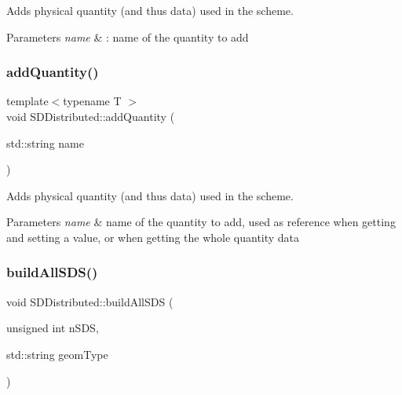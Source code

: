 Adds physical quantity (and thus data) used in the scheme. 


\begin{DoxyParams}{Parameters}
{\em name} & \+: name of the quantity to add \\
\hline
\end{DoxyParams}
\mbox{\label{classSDDistributed_a82b5a390e964051d1952c683b4fa5f05}} 
\subsubsection{\texorpdfstring{add\+Quantity()}{addQuantity()}\hspace{0.1cm}{\footnotesize\ttfamily [2/2]}}
{\footnotesize\ttfamily template$<$typename T $>$ \\
void S\+D\+Distributed\+::add\+Quantity (\begin{DoxyParamCaption}\item[{std\+::string}]{name }\end{DoxyParamCaption})}



Adds physical quantity (and thus data) used in the scheme. 


\begin{DoxyParams}{Parameters}
{\em name} & name of the quantity to add, used as reference when getting and setting a value, or when getting the whole quantity data \\
\hline
\end{DoxyParams}
\mbox{\label{classSDDistributed_a3dbacea02c2d4f36310c81f87f90fe5a}} 
\subsubsection{\texorpdfstring{build\+All\+S\+D\+S()}{buildAllSDS()}\hspace{0.1cm}{\footnotesize\ttfamily [1/2]}}
{\footnotesize\ttfamily void S\+D\+Distributed\+::build\+All\+S\+DS (\begin{DoxyParamCaption}\item[{unsigned int}]{n\+S\+DS,  }\item[{std\+::string}]{geom\+Type }\end{DoxyParamCaption})}



